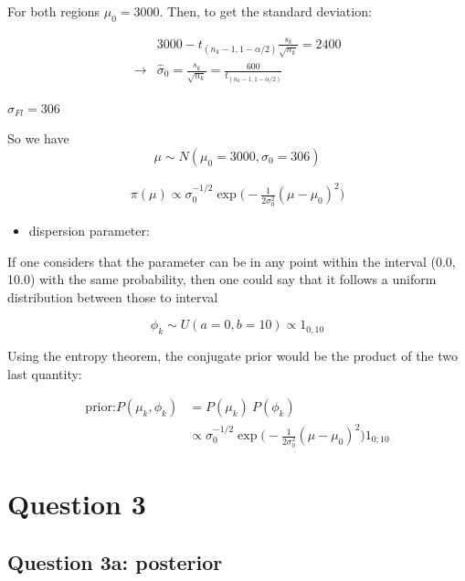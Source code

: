 \documentclass[a4paper, 12pt]{article}
\providecommand{\tightlist}{\setlength{\itemsep}{0pt}\setlength{\parskip}{0pt}}
\begin{document}
    For both regions \(\mu_0 = 3000\). Then, to get the standard
    deviation:

    \[
    \begin{split}
    & 3000 - t_{(n_k-1, 1-\alpha/2)} \frac{s_k}{\sqrt{n_k}} = 2400 \\
    \rightarrow  & \hat{\sigma}_0 = \frac{s_k}{\sqrt{n_k}}= \frac{600}{t_{(n_k-1, 1-\alpha/2)}}
    \end{split}
    \]

    \(\hat{\sigma}_{Fl} = 306\)

    So we have \[\mu \sim N(\mu_0= 3000, \sigma_0 =306)\]

    \[
    \begin{split}
     \pi(\mu) \propto \sigma_0^{-1/2} \exp{ \big(-\frac{1}{2\sigma_0^2}(\mu-\mu_0)^2\big) }
    \end{split}
    \]

    \begin{itemize}
    \tightlist
    \item
      dispersion parameter:
    \end{itemize}

    If one considers that the parameter can be in any point within the
    interval (0.0, 10.0) with the same probability, then one could say
    that it follows a uniform distribution between those to interval

    \[
    \phi_k \sim U (a=0,b=10) \propto 1_{0,10}
    \]

    Using the entropy theorem, the conjugate prior would be the product
    of the two last quantity:

    \[
    \begin{split} 
    \text{prior:}  P(\mu_k, \phi_k) & = P(\mu_k) \ P(\phi_k) \\
    & \propto \sigma_0^{-1/2} \exp{ \big(-\frac{1}{2\sigma_0^2}(\mu-\mu_0)^2\big) } 1_{0;10}
    \end{split}
    \]

    \hypertarget{question-3}{%
    \section{Question 3}\label{question-3}}

    \hypertarget{question-3a-posterior}{%
    \subsection{Question 3a: posterior}\label{question-3a-posterior}}
\end{document}
